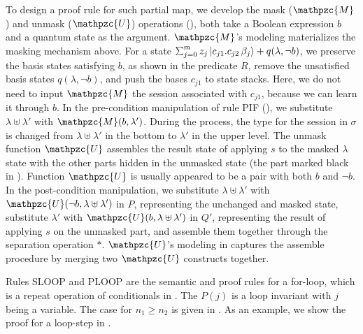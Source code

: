 To design a proof rule for such partial map, we develop the mask ($\mathpzc{M}$) and unmask ($\mathpzc{U}$) operations (), both take a Boolean expression $b$ and a quantum state as the argument. $\mathpzc{M}$'s modeling materializes the masking mechanism above. For a state $\sch{m}{z_j}{c_{j1}.c_{j2}\,\beta_j}+q(\lambda,\neg b)$, we preserve the basis states satisfying $b$, as shown in the predicate $R$, remove the unsatisfied basis states $q(\lambda,\neg b)$, and push the bases $c_{j1}$ to state stacks.
Here, we do not need to input $\mathpzc{M}$ the session associated with $c_{j1}$, because we can learn it through $b$.
In the pre-condition manipulation of rule \textsc{PIF} (), we substitute $\lambda \uplus \lambda'$ with $\mathpzc{M}(b,\lambda')$. During the process, the type for the session in $\sigma$ is changed from $\lambda \uplus \lambda'$ in the bottom to $\lambda'$ in the upper level.
The unmask function $\mathpzc{U}$ assembles the result state of applying $s$ to the masked $\lambda$ state with the other parts hidden in the unmasked state (the part marked black in ). Function $\mathpzc{U}$ is usually appeared to be a pair with both $b$ and $\neg b$. In the post-condition manipulation, we substitute $\lambda \uplus \lambda'$ with $\mathpzc{U}(\neg b,\lambda \uplus \lambda')$ in $P$, representing the unchanged and masked state, substitute $\lambda'$ with $\mathpzc{U}(b,\lambda \uplus \lambda')$ in $Q'$, representing the result of applying $s$ on the unmasked part, and assemble them together through the separation operation $*$.
$\mathpzc{U}$'s modeling in  captures the assemble procedure by merging two $\mathpzc{U}$ constructs together.

Rules \textsc{SLOOP} and \textsc{PLOOP} are the semantic and proof rules for a for-loop, which is a repeat operation of conditionals in \qafny. The $P(j)$ is a loop invariant with $j$ being a variable. The case for $n_1 \ge n_2$ is given in . As an example, we show the proof for a loop-step in .

